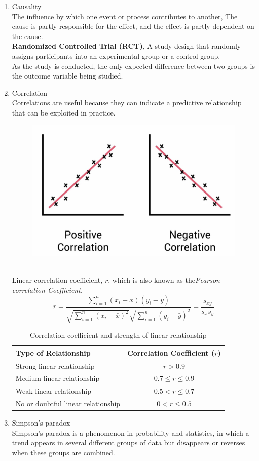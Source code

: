 \begin{enumerate}
    \item Causality \\ 
    The influence by which one event or process contributes to another, The cause is partly responsible for the effect, and the effect is partly dependent on the cause.\\
    \textbf{Randomized Controlled Trial (RCT)}, A study design that randomly assigns participants into an experimental group or a control group.\\
    As the study is conducted, the only expected difference between two groups is the outcome variable being studied.
    \item Correlation \\
    Correlations are useful because they can indicate a predictive relationship that can be exploited in practice.
    \begin{figure}[h]
        \centering
        \includegraphics[width=0.75\linewidth]{image/correlation.png}
    \end{figure} \\
    Linear correlation coefficient, $r$, which is also known as the\textit{Pearson correlation Coefficient}. 
    \[r = \frac{\sum_{i=1}^{n} (x_i - \bar{x})(y_i - \bar{y})}
    {\sqrt{\sum_{i=1}^{n} (x_i - \bar{x})^2} \sqrt{\sum_{i=1}^{n} (y_i - \bar{y})^2}}
    = \frac{s_{xy}}{s_x s_y}\]
    \begin{table}[h]
        \centering
        \begin{tabular}{lc}
        \hline
        \textbf{Type of Relationship} & \textbf{Correlation Coefficient (\( r \))} \\
        \hline
        Strong linear relationship & \( r > 0.9 \) \\
        Medium linear relationship & \( 0.7 \leq r \leq 0.9 \) \\
        Weak linear relationship & \( 0.5 < r \leq 0.7 \) \\
        No or doubtful linear relationship & \( 0 < r \leq 0.5 \) \\
        \hline
        \end{tabular}
        \caption{Correlation coefficient and strength of linear relationship}
    \end{table}
    \item Simpson's paradox \\
    Simpson's paradox is a phenomenon in probability and statistics, in which a trend appears in several different groups of data but disappears or reverses when these groups are combined.
\end{enumerate}
